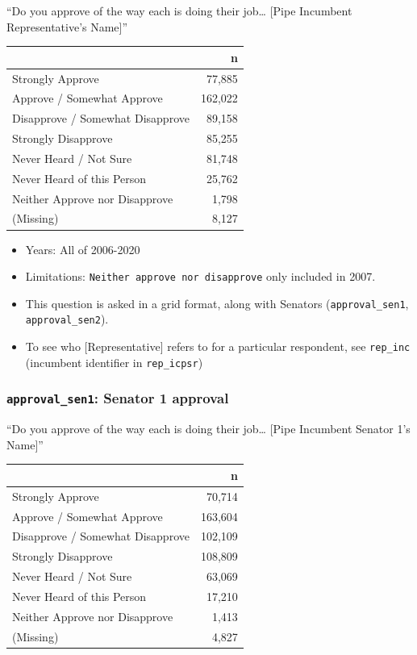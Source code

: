 \documentclass[10pt,article,oneside]{memoir}
\theoremstyle{definition}
\begin{document}
``Do you approve of the way each is doing their job\ldots{} {[}Pipe
Incumbent Representative's Name{]}''

\begin{table}[H]
\centering
\begin{tabular}[t]{lr}
\toprule
 & n\\
\midrule
Strongly Approve & 77,885\\
Approve / Somewhat Approve & 162,022\\
Disapprove / Somewhat Disapprove & 89,158\\
Strongly Disapprove & 85,255\\
Never Heard / Not Sure & 81,748\\
Never Heard of this Person & 25,762\\
Neither Approve nor Disapprove & 1,798\\
(Missing) & 8,127\\
\bottomrule
\end{tabular}
\end{table}

\begin{itemize}
\tightlist
\item
  Years: All of 2006-2020
\item
  Limitations: \texttt{Neither\ approve\ nor\ disapprove} only included
  in 2007.
\item
  This question is asked in a grid format, along with Senators
  (\texttt{approval\_sen1}, \texttt{approval\_sen2}).
\item
  To see who {[}Representative{]} refers to for a particular respondent,
  see \texttt{rep\_inc} (incumbent identifier in \texttt{rep\_icpsr})
\end{itemize}

\hypertarget{approval_sen1-senator-1-approval}{%
\subsubsection{\texorpdfstring{\texttt{approval\_sen1}: Senator 1
approval}{approval\_sen1: Senator 1 approval}}\label{approval_sen1-senator-1-approval}}

``Do you approve of the way each is doing their job\ldots{} {[}Pipe
Incumbent Senator 1's Name{]}''

\begin{table}[H]
\centering
\begin{tabular}[t]{lr}
\toprule
 & n\\
\midrule
Strongly Approve & 70,714\\
Approve / Somewhat Approve & 163,604\\
Disapprove / Somewhat Disapprove & 102,109\\
Strongly Disapprove & 108,809\\
Never Heard / Not Sure & 63,069\\
Never Heard of this Person & 17,210\\
Neither Approve nor Disapprove & 1,413\\
(Missing) & 4,827\\
\bottomrule
\end{tabular}
\end{table}
\end{document}
